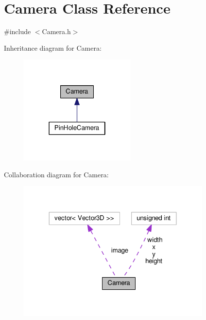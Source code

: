 \hypertarget{classCamera}{}\section{Camera Class Reference}
\label{classCamera}


{\ttfamily \#include $<$Camera.\+h$>$}



Inheritance diagram for Camera\+:\nopagebreak
\begin{figure}[H]
\begin{center}
\leavevmode
\includegraphics[width=166pt]{classCamera__inherit__graph}
\end{center}
\end{figure}


Collaboration diagram for Camera\+:\nopagebreak
\begin{figure}[H]
\begin{center}
\leavevmode
\includegraphics[width=276pt]{classCamera__coll__graph}
\end{center}
\end{figure}
